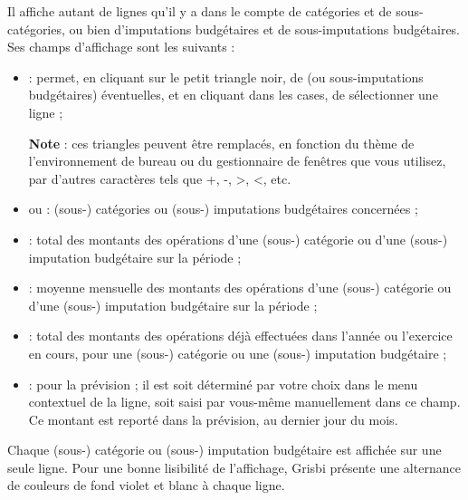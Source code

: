 Il affiche autant de lignes qu'il y a dans le compte de catégories et de sous-catégories, ou bien d'imputations budgétaires et de sous-imputations budgétaires. Ses champs d'affichage sont les suivants :
\begin{itemize}
	\item{} : permet, en cliquant sur le petit triangle noir, de  (ou sous-imputations budgétaires) éventuelles, et en cliquant dans les cases, de sélectionner une ligne ; 

	\textbf{Note} : ces triangles peuvent être remplacés, en fonction du thème de l'environnement de bureau ou du gestionnaire de fenêtres que vous utilisez, par d'autres caractères tels que +, -, >, <, etc.
	
	\item {} ou  : (sous-) catégories ou (sous-) imputations budgétaires concernées ;
	\item {} : total des montants des opérations d'une (sous-) catégorie ou d'une (sous-) imputation budgétaire sur la période ;
	\item {} : moyenne mensuelle des montants des opérations d'une (sous-) catégorie ou d'une (sous-) imputation budgétaire sur la période ;
	\item {} : total des montants des opérations déjà effectuées dans l'année ou l'exercice en cours, pour une (sous-) catégorie ou une (sous-) imputation budgétaire ;
	\item {} :  pour la prévision ; il est soit déterminé par votre choix dans le menu contextuel de la ligne, soit saisi par vous-même manuellement dans ce champ. Ce montant est reporté dans la prévision, au dernier jour du mois.
\end{itemize}
 


Chaque (sous-) catégorie ou (sous-) imputation budgétaire est affichée sur une seule ligne. Pour une bonne lisibilité de l'affichage, Grisbi présente une alternance de couleurs de fond violet et blanc{\couleurs} à chaque ligne.

